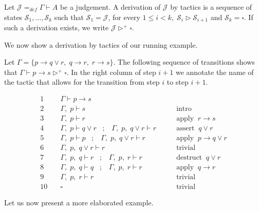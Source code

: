 \documentclass[a4paper,UKenglish]{lipics}
\newcommand{\G}{\Gamma}
\newcommand{\Sc}{\mathcal{S}}
\begin{document}
\begin{definition}\label{def:dertac}
 Let $\mathcal{J}=_{def}\G\vdash A$ be a judgement. A derivation of $\mathcal{J}$ by tactics is a sequence of states $\Sc_1,\ldots,\Sc_k$ such that $\Sc_1=\mathcal{J}$, for every $1\leq i<k,\;\Sc_i\rhd \Sc_{i+1}$ and $\Sc_k=\square$. If such a derivation exists, we write $\mathcal{J}\rhd^+\square$. 
\end{definition}

We now show a derivation by tactics of our running example.

\begin{example}
Let 
$\G=\{p \to q \lor  r ,\;q\to r,\;r\to s\}$. The following sequence of transitions
shows that $\G\vdash p\to s \rhd^+ \square$. In the right column of step $i+1$ we annotate the name of the tactic that allows for the transition from step $i$ to step $i+1$. 

\[
\begin{array}{rll}
1\quad & \G\vdash p\to s &  \\
2 \quad & \G,\;p \vdash s & \qquad \mbox{intro} \\
3 \quad & \G,\;p \vdash r & \qquad \mbox {apply} \;\; r\to s \\
4 \quad & \G,\;p\vdash q\lor r\;\;\; ; \;\;\; \G,\;p,\;q\lor r\vdash r & \qquad \mbox{assert} \;\; q \lor r \\
5 \quad & \G,\;p\vdash p\;\;\; ; \;\;\; \G,\;p,\;q\lor r\vdash r& \qquad \mbox{apply}\;\;p\to q\lor r \\
6 \quad & \G,\;p,\;q\lor r\vdash r & \qquad \mbox{trivial} \\ 
7\quad & \G,\;p,\;q \vdash r \;\;\; ; \;\;\; \G,\;p,\;r \vdash r & \qquad \mbox{destruct} \;\; q\lor r \\
8 \quad & \G,\;p,\;q \vdash q \;\;\; ; \;\;\; \G,\;p,\;r \vdash r & \qquad \mbox{apply}\;\; q\to r \\
9 \quad & \G,\;p,\;r \vdash r &\qquad \mbox{trivial} \\
10 \quad & \square & \qquad  \mbox{trivial}
\end{array}\]
\end{example}


Let us now present a more elaborated example.
\end{document}
